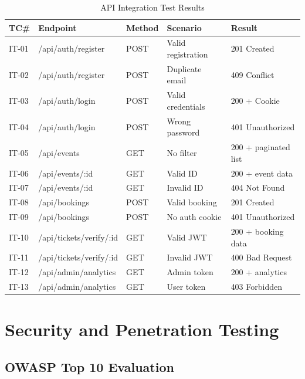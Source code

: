 \documentclass[12pt,a4paper]{report}
\begin{document}
\begin{table}[H]
    \centering
    \caption{API Integration Test Results}
    \vspace{0.2cm}
    \begin{tabular}{|p{1.5cm}|p{4cm}|p{2.5cm}|p{3cm}|p{2.5cm}|}
        \hline
        \textbf{TC\#} & \textbf{Endpoint} & \textbf{Method} & \textbf{Scenario} & \textbf{Result} \\
        \hline
        IT-01 & /api/auth/register & POST & Valid registration & 201 Created \\
        \hline
        IT-02 & /api/auth/register & POST & Duplicate email & 409 Conflict \\
        \hline
        IT-03 & /api/auth/login & POST & Valid credentials & 200 + Cookie \\
        \hline
        IT-04 & /api/auth/login & POST & Wrong password & 401 Unauthorized \\
        \hline
        IT-05 & /api/events & GET & No filter & 200 + paginated list \\
        \hline
        IT-06 & /api/events/:id & GET & Valid ID & 200 + event data \\
        \hline
        IT-07 & /api/events/:id & GET & Invalid ID & 404 Not Found \\
        \hline
        IT-08 & /api/bookings & POST & Valid booking & 201 Created \\
        \hline
        IT-09 & /api/bookings & POST & No auth cookie & 401 Unauthorized \\
        \hline
        IT-10 & /api/tickets/verify/:id & GET & Valid JWT & 200 + booking data \\
        \hline
        IT-11 & /api/tickets/verify/:id & GET & Invalid JWT & 400 Bad Request \\
        \hline
        IT-12 & /api/admin/analytics & GET & Admin token & 200 + analytics \\
        \hline
        IT-13 & /api/admin/analytics & GET & User token & 403 Forbidden \\
        \hline
    \end{tabular}
\end{table}

\section{Security and Penetration Testing}

\subsection{OWASP Top 10 Evaluation}
\end{document}
